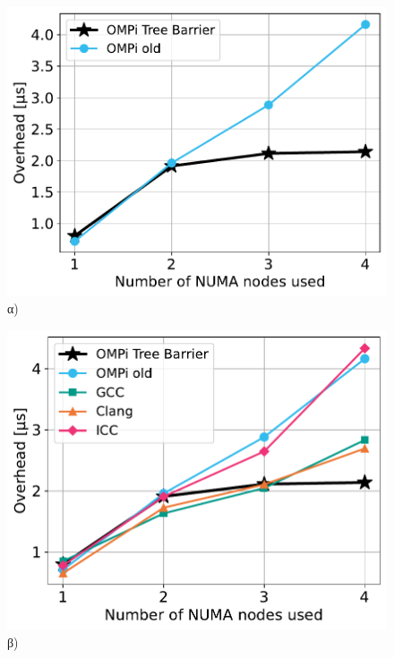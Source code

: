\begin{figure}[htbp]
    \centering
    \begin{minipage}{0.5\textwidth}
        \centering
        \includegraphics[width=1\textwidth]{Figures/parade-epcc/ompionly_sockets_tpn-8_close.pdf}
		α)
    \end{minipage}\hfill
     \begin{minipage}{0.5\textwidth}
        \centering
        \includegraphics[width=1\textwidth]{Figures/parade-epcc/sockets_tpn-8_close.pdf}
		β)
    \end{minipage}
    \newline
    \begin{minipage}{0.5\textwidth}

\end{minipage}
\end{figure}
